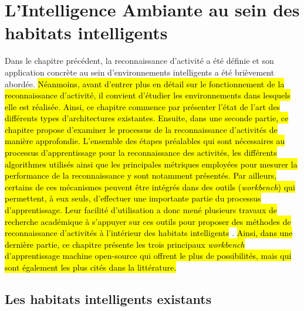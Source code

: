 \chapter{L'Intelligence Ambiante au sein des habitats intelligents}
\label{chap:2}

Dans le chapitre précédent, la reconnaissance d'activité a été définie et son application concrète au sein d'environnements intelligents a été brièvement abordée. \hl{Néanmoins, avant d'entrer plus en détail sur le fonctionnement de la reconnaissance d'activité, il convient d'étudier les environnements dans lesquels elle est réalisée. Ainsi, ce chapitre commence par présenter l'état de l'art des différents types d'architectures existantes. Ensuite, dans une seconde partie, ce chapitre propose d'examiner le processus de la reconnaissance d'activités de manière approfondie. L'ensemble des étapes préalables qui sont nécessaires au processus d'apprentissage pour la reconnaissance des activités, les différents algorithmes utilisés ainsi que les principales métriques employées pour mesurer la performance de la reconnaissance y sont notamment présentés. Par ailleurs, certains de ces mécanismes peuvent être intégrés dans des outils (\textit{workbench}) qui permettent, à eux seuls, d'effectuer une importante partie du processus d'apprentissage. Leur facilité d'utilisation a donc mené plusieurs travaux de recherche académique à s'appuyer sur ces outils pour proposer des méthodes de reconnaissance d'activités à l'intérieur des habitats intelligents} \citep{Maurer2006, Shoaib2013, Ramirez-Prado2019}. \hl{Ainsi, dans une dernière partie, ce chapitre présente les trois principaux \textit{workbench} d'apprentissage machine open-source qui offrent le plus de possibilités, mais qui sont également les plus cités dans la littérature.}

\section{Les habitats intelligents existants}

